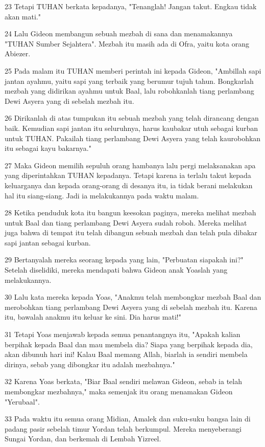 \par 23 Tetapi TUHAN berkata kepadanya, "Tenanglah! Jangan takut. Engkau tidak akan mati."
\par 24 Lalu Gideon membangun sebuah mezbah di sana dan menamakannya "TUHAN Sumber Sejahtera". Mezbah itu masih ada di Ofra, yaitu kota orang Abiezer.
\par 25 Pada malam itu TUHAN memberi perintah ini kepada Gideon, "Ambillah sapi jantan ayahmu, yaitu sapi yang terbaik yang berumur tujuh tahun. Bongkarlah mezbah yang didirikan ayahmu untuk Baal, lalu robohkanlah tiang perlambang Dewi Asyera yang di sebelah mezbah itu.
\par 26 Dirikanlah di atas tumpukan itu sebuah mezbah yang telah dirancang dengan baik. Kemudian sapi jantan itu seluruhnya, harus kaubakar utuh sebagai kurban untuk TUHAN. Pakailah tiang perlambang Dewi Asyera yang telah kaurobohkan itu sebagai kayu bakarnya."
\par 27 Maka Gideon memilih sepuluh orang hambanya lalu pergi melaksanakan apa yang diperintahkan TUHAN kepadanya. Tetapi karena ia terlalu takut kepada keluarganya dan kepada orang-orang di desanya itu, ia tidak berani melakukan hal itu siang-siang. Jadi ia melakukannya pada waktu malam.
\par 28 Ketika penduduk kota itu bangun keesokan paginya, mereka melihat mezbah untuk Baal dan tiang perlambang Dewi Asyera sudah roboh. Mereka melihat juga bahwa di tempat itu telah dibangun sebuah mezbah dan telah pula dibakar sapi jantan sebagai kurban.
\par 29 Bertanyalah mereka seorang kepada yang lain, "Perbuatan siapakah ini?" Setelah diselidiki, mereka mendapati bahwa Gideon anak Yoaslah yang melakukannya.
\par 30 Lalu kata mereka kepada Yoas, "Anakmu telah membongkar mezbah Baal dan merobohkan tiang perlambang Dewi Asyera yang di sebelah mezbah itu. Karena itu, bawalah anakmu itu keluar ke sini. Dia harus mati!"
\par 31 Tetapi Yoas menjawab kepada semua penantangnya itu, "Apakah kalian berpihak kepada Baal dan mau membela dia? Siapa yang berpihak kepada dia, akan dibunuh hari ini! Kalau Baal memang Allah, biarlah ia sendiri membela dirinya, sebab yang dibongkar itu adalah mezbahnya."
\par 32 Karena Yoas berkata, "Biar Baal sendiri melawan Gideon, sebab ia telah membongkar mezbahnya," maka semenjak itu orang menamakan Gideon "Yerubaal".
\par 33 Pada waktu itu semua orang Midian, Amalek dan suku-suku bangsa lain di padang pasir sebelah timur Yordan telah berkumpul. Mereka menyeberangi Sungai Yordan, dan berkemah di Lembah Yizreel.
